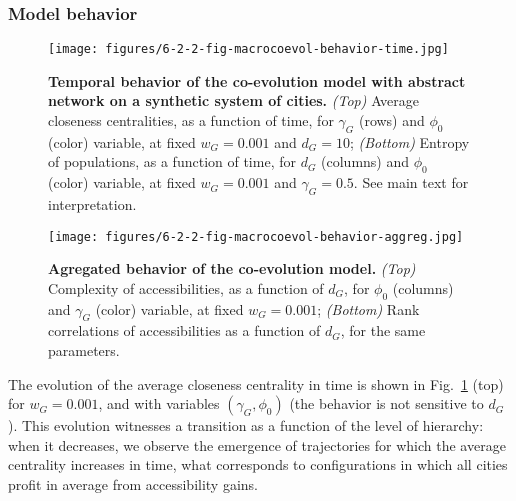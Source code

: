 \subsubsection{Model behavior}


\begin{figure}
\texttt{[image: figures/6-2-2-fig-macrocoevol-behavior-time.jpg]}
\caption{\textbf{Temporal behavior of the co-evolution model with abstract network on a synthetic system of cities.} \textit{(Top)} Average closeness centralities, as a function of time, for $\gamma_G$ (rows) and $\phi_0$ (color) variable, at fixed $w_G = 0.001$ and $d_G = 10$; \textit{(Bottom)} Entropy of populations, as a function of time, for $d_G$ (columns) and $\phi_0$ (color) variable, at fixed $w_G = 0.001$ and $\gamma_G = 0.5$. See main text for interpretation.\label{fig:macrocoevol:behavior-time}}
\end{figure}


\begin{figure}
\texttt{[image: figures/6-2-2-fig-macrocoevol-behavior-aggreg.jpg]}
\caption{\textbf{Agregated behavior of the co-evolution model.} \textit{(Top)} Complexity of accessibilities, as a function of $d_G$, for $\phi_0$ (columns) and $\gamma_G$ (color) variable, at fixed $w_G = 0.001$; \textit{(Bottom)} Rank correlations of accessibilities as a function of $d_G$, for the same parameters.\label{fig:macrocoevol:behavior-aggreg}}
\end{figure}


The evolution of the average closeness centrality in time is shown in Fig.~\ref{fig:macrocoevol:behavior-time} (top) for $w_G = 0.001$, and with variables $(\gamma_G,\phi_0)$ (the behavior is not sensitive to $d_G$). This evolution witnesses a transition as a function of the level of hierarchy: when it decreases, we observe the emergence of trajectories for which the average centrality increases in time, what corresponds to configurations in which all cities profit in average from accessibility gains. 


